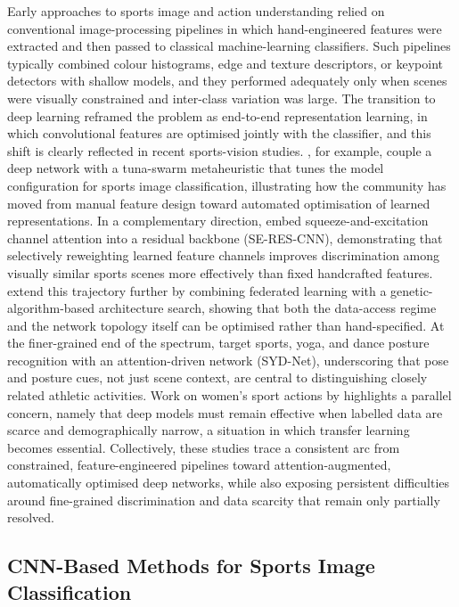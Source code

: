 Early approaches to sports image and action understanding relied on conventional image-processing pipelines in which hand-engineered features were extracted and then passed to classical machine-learning classifiers.
Such pipelines typically combined colour histograms, edge and texture descriptors, or keypoint detectors with shallow models, and they performed adequately only when scenes were visually constrained and inter-class variation was large.
The transition to deep learning reframed the problem as end-to-end representation learning, in which convolutional features are optimised jointly with the classifier, and this shift is clearly reflected in recent sports-vision studies.
\citet{zhou2024tuna}, for example, couple a deep network with a tuna-swarm metaheuristic that tunes the model configuration for sports image classification, illustrating how the community has moved from manual feature design toward automated optimisation of learned representations.
In a complementary direction, \citet{li2024seres} embed squeeze-and-excitation channel attention into a residual backbone (SE-RES-CNN), demonstrating that selectively reweighting learned feature channels improves discrimination among visually similar sports scenes more effectively than fixed handcrafted features.
\citet{fu2024federated} extend this trajectory further by combining federated learning with a genetic-algorithm-based architecture search, showing that both the data-access regime and the network topology itself can be optimised rather than hand-specified.
At the finer-grained end of the spectrum, \citet{bera2023finegrained} target sports, yoga, and dance posture recognition with an attention-driven network (SYD-Net), underscoring that pose and posture cues, not just scene context, are central to distinguishing closely related athletic activities.
Work on women's sport actions by \citet{ray2025womensports} highlights a parallel concern, namely that deep models must remain effective when labelled data are scarce and demographically narrow, a situation in which transfer learning becomes essential.
Collectively, these studies trace a consistent arc from constrained, feature-engineered pipelines toward attention-augmented, automatically optimised deep networks, while also exposing persistent difficulties around fine-grained discrimination and data scarcity that remain only partially resolved.

\subsection{CNN-Based Methods for Sports Image Classification}
\label{subsec:cnnsports}

